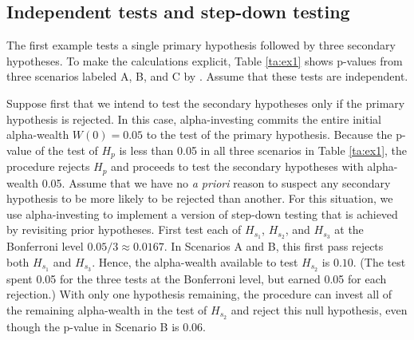 \documentclass[12pt]{article}
\begin{document}
 \subsection{ Independent tests and step-down testing }

 The first example tests a single primary hypothesis followed by three secondary
 hypotheses.  To make the calculations explicit, Table \ref{ta:ex1} shows
 p-values from three scenarios labeled A, B, and C by \citet{chen05}. Assume
 that these tests are independent.


 Suppose first that we intend to test the secondary hypotheses only if the
 primary hypothesis is rejected.  In this case, alpha-investing commits the
 entire initial alpha-wealth $W(0) = 0.05$ to the test of the primary
 hypothesis.  Because the p-value of the test of $H_p$ is less than 0.05 in all
 three scenarios in Table \ref{ta:ex1}, the procedure rejects $H_p$ and proceeds
 to test the secondary hypotheses with alpha-wealth 0.05.  Assume that we have
 no {\it a priori} reason to suspect any secondary hypothesis to be more likely
 to be rejected than another.  For this situation, we use alpha-investing to
 implement a version of step-down testing that is achieved by revisiting prior
 hypotheses.  First test each of $H_{s_1}$, $H_{s_2}$, and $H_{s_3}$ at the
 Bonferroni level $0.05/3 \approx 0.0167$.  In Scenarios A and B, this first
 pass rejects both $H_{s_1}$ and $H_{s_3}$.  Hence, the alpha-wealth available
 to test $H_{s_2}$ is $0.10$. (The test spent 0.05 for the three tests at the
 Bonferroni level, but earned 0.05 for each rejection.)  With only one
 hypothesis remaining, the procedure can invest all of the remaining
 alpha-wealth in the test of $H_{s_2}$ and reject this null hypothesis, even
 though the p-value in Scenario B is 0.06.
\end{document}
